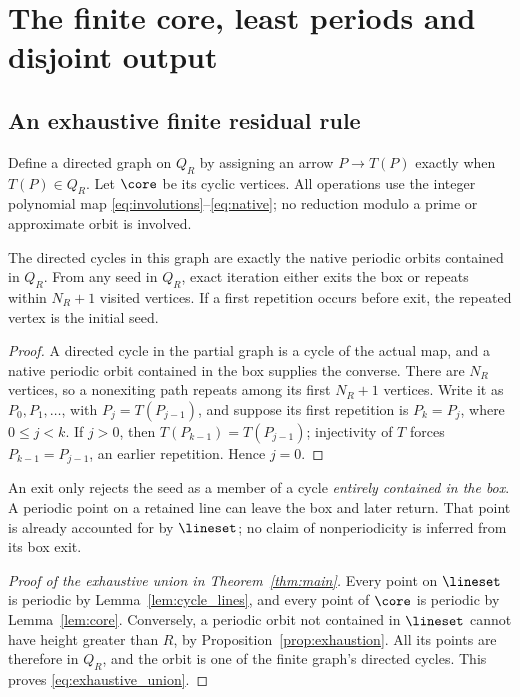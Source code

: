 \section{The finite core, least periods and disjoint output}\label{sec:effective}

\subsection{An exhaustive finite residual rule}

Define a directed graph on \(Q_R\) by assigning an arrow
\(P\to T(P)\) exactly when \(T(P)\in Q_R\). Let \(\core\) be its
cyclic vertices. All operations use the integer polynomial map
\eqref{eq:involutions}--\eqref{eq:native}; no reduction modulo a prime
or approximate orbit is involved.

\begin{lemma}\label{lem:core}
The directed cycles in this graph are exactly the native periodic
orbits contained in \(Q_R\). From any seed in \(Q_R\), exact iteration
either exits the box or repeats within \(N_R+1\) visited vertices.
If a first repetition occurs before exit, the repeated vertex is the
initial seed.
\end{lemma}

\begin{proof}
A directed cycle in the partial graph is a cycle of the actual map,
and a native periodic orbit contained in the box supplies the converse.
There are \(N_R\) vertices, so a nonexiting path repeats among its
first \(N_R+1\) vertices. Write it as \(P_0,P_1,\ldots\), with
\(P_j=T(P_{j-1})\), and suppose its first repetition is
\(P_k=P_j\), where \(0\le j<k\). If \(j>0\), then
\(T(P_{k-1})=T(P_{j-1})\); injectivity of \(T\) forces
\(P_{k-1}=P_{j-1}\), an earlier repetition. Hence \(j=0\).
\end{proof}

An exit only rejects the seed as a member of a cycle \emph{entirely
contained in the box}. A periodic point on a retained line can leave
the box and later return. That point is already accounted for by
\(\lineset\); no claim of nonperiodicity is inferred from its box exit.

\begin{proof}[Proof of the exhaustive union in Theorem~\ref{thm:main}]
Every point on \(\lineset\) is periodic by
Lemma~\ref{lem:cycle_lines}, and every point of \(\core\) is periodic
by Lemma~\ref{lem:core}. Conversely, a periodic orbit not contained
in \(\lineset\) cannot have height greater than \(R\), by
Proposition~\ref{prop:exhaustion}. All its points are therefore in
\(Q_R\), and the orbit is one of the finite graph's directed cycles.
This proves \eqref{eq:exhaustive_union}.
\end{proof}

